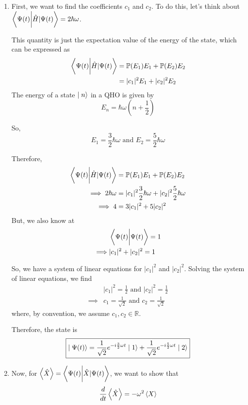 \documentclass[twoside]{article}
\begin{document}
\begin{enumerate}
   \item First, we want to find the coefficients $c_1$ and $c_2$.
   To do this, let's think about $\left\langle \Psi(t) \bigg\rvert \hat{H}|\Psi(t) \right\rangle = 2\hbar\omega$. 

   This quantity is just the expectation value of the energy of the state, which can be expressed as 
   \begin{align*}
      \left\langle \Psi(t) \bigg\rvert \hat{H}|\Psi(t) \right\rangle &= \mathbb{P}(E_1)E_1 + \mathbb{P}(E_2)E_2 \\
                                       &= |c_1|^2 E_1 + |c_2|^2 E_2
   \end{align*}
   The energy of a state $\mid n\rangle$ in a QHO is given by 
   \[ E_n = \hbar\omega (n + \frac{1}{2}) \]

   So,
   \[  E_1 = \frac{3}{2} \hbar\omega \text{   and   } E_2 = \frac{5}{2} \hbar\omega \]

   Therefore,
   \begin{align*}
      \left\langle \Psi(t) \bigg\rvert \hat{H}|\Psi(t) \right\rangle &= \mathbb{P}(E_1)E_1 + \mathbb{P}(E_2)E_2 \\
                 \implies 2\hbar\omega &= |c_1|^2 \frac{3}{2} \hbar\omega+ |c_2|^2 \frac{5}{2} \hbar\omega \\
                 \implies 4 &= 3|c_1|^2 + 5|c_2|^2 
   \end{align*}
   But, we also know at 
   \begin{align*}
      &\left\langle \Psi(t) \bigg\rvert \Psi(t) \right\rangle = 1 \\
      \implies& |c_1|^2 + |c_2|^2 = 1
   \end{align*}

   So, we have a system of linear equations for $|c_1|^2$ and $|c_2|^2$. Solving the system of linear equations, we find
   \begin{align*}
      &|c_1|^2 = \frac{1}{2} \text{   and   } |c_2|^2 = \frac{1}{2} \\
      \implies& c_1 = \frac{1}{\sqrt{2}} \text{   and   } c_2 = \frac{1}{\sqrt{2}}
   \end{align*}
   where, by convention, we assume $c_1, c_2 \in \mathbb{R}$.

   Therefore, the state is 
   \[ \boxed{
      \mid\Psi(t)\rangle = \frac{1}{\sqrt{2}}e^{-i \frac{3}{2} \omega t} \mid1\rangle +  \frac{1}{\sqrt{2}} e^{-i \frac{5}{2} \omega t} \mid2\rangle 
   } \]

   \vskip 0.5cm

   \item Now, for $\left\langle \hat{X} \right\rangle = \left\langle \Psi(t) \bigg\rvert \hat{X}|\Psi(t) \right\rangle$, we want to show that 
   \[ \frac{d}{dt}\left\langle \hat{X} \right\rangle = -\omega^2 \left\langle X \right\rangle \] 


\end{enumerate}
\end{document}
